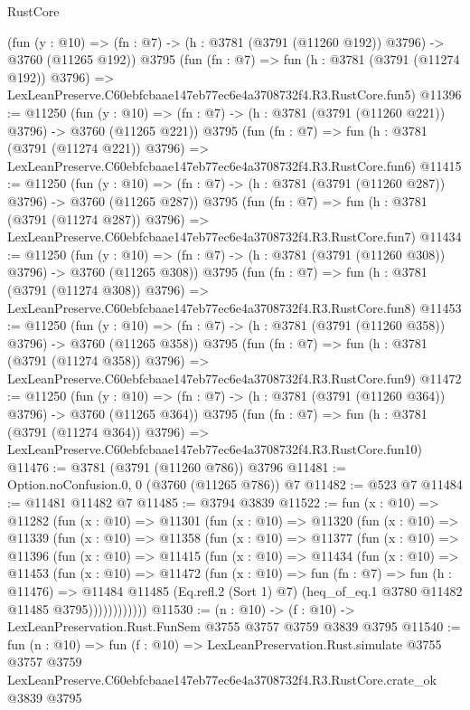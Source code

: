 \begin{lexlean}{RustCore}
\begin{coremodule}
    (fun (y : @10) => (fn : @7) -> (h : @3781 (@3791 (@11260 @192)) @3796) -> @3760 (@11265 @192))
    @3795
    (fun (fn : @7) =>
    fun (h : @3781 (@3791 (@11274 @192)) @3796) =>
    LexLeanPreserve.C60ebfcbaae147eb77ec6e4a3708732f4.R3.RustCore.fun5)
@11396 := @11250
    (fun (y : @10) => (fn : @7) -> (h : @3781 (@3791 (@11260 @221)) @3796) -> @3760 (@11265 @221))
    @3795
    (fun (fn : @7) =>
    fun (h : @3781 (@3791 (@11274 @221)) @3796) =>
    LexLeanPreserve.C60ebfcbaae147eb77ec6e4a3708732f4.R3.RustCore.fun6)
@11415 := @11250
    (fun (y : @10) => (fn : @7) -> (h : @3781 (@3791 (@11260 @287)) @3796) -> @3760 (@11265 @287))
    @3795
    (fun (fn : @7) =>
    fun (h : @3781 (@3791 (@11274 @287)) @3796) =>
    LexLeanPreserve.C60ebfcbaae147eb77ec6e4a3708732f4.R3.RustCore.fun7)
@11434 := @11250
    (fun (y : @10) => (fn : @7) -> (h : @3781 (@3791 (@11260 @308)) @3796) -> @3760 (@11265 @308))
    @3795
    (fun (fn : @7) =>
    fun (h : @3781 (@3791 (@11274 @308)) @3796) =>
    LexLeanPreserve.C60ebfcbaae147eb77ec6e4a3708732f4.R3.RustCore.fun8)
@11453 := @11250
    (fun (y : @10) => (fn : @7) -> (h : @3781 (@3791 (@11260 @358)) @3796) -> @3760 (@11265 @358))
    @3795
    (fun (fn : @7) =>
    fun (h : @3781 (@3791 (@11274 @358)) @3796) =>
    LexLeanPreserve.C60ebfcbaae147eb77ec6e4a3708732f4.R3.RustCore.fun9)
@11472 := @11250
    (fun (y : @10) => (fn : @7) -> (h : @3781 (@3791 (@11260 @364)) @3796) -> @3760 (@11265 @364))
    @3795
    (fun (fn : @7) =>
    fun (h : @3781 (@3791 (@11274 @364)) @3796) =>
    LexLeanPreserve.C60ebfcbaae147eb77ec6e4a3708732f4.R3.RustCore.fun10)
@11476 := @3781 (@3791 (@11260 @786)) @3796
@11481 := Option.noConfusion.{0, 0} (@3760 (@11265 @786)) @7
@11482 := @523 @7
@11484 := @11481 @11482 @7
@11485 := @3794 @3839
@11522 := fun (x : @10) =>
  @11282
    (fun (x : @10) =>
    @11301
      (fun (x : @10) =>
      @11320
        (fun (x : @10) =>
        @11339
          (fun (x : @10) =>
          @11358
            (fun (x : @10) =>
            @11377
              (fun (x : @10) =>
              @11396
                (fun (x : @10) =>
                @11415
                  (fun (x : @10) =>
                  @11434
                    (fun (x : @10) =>
                    @11453
                      (fun (x : @10) =>
                      @11472
                        (fun (x : @10) =>
                        fun (fn : @7) =>
                        fun (h : @11476) =>
                        @11484
                          @11485
                          (Eq.refl.{2} (Sort 1) @7)
                          (heq_of_eq.{1} @3780 @11482 @11485 @3795))))))))))))
@11530 := (n : @10) -> (f : @10) -> LexLeanPreservation.Rust.FunSem @3755 @3757 @3759 @3839 @3795
@11540 := fun (n : @10) =>
  fun (f : @10) =>
  LexLeanPreservation.Rust.simulate
    @3755
    @3757
    @3759
    LexLeanPreserve.C60ebfcbaae147eb77ec6e4a3708732f4.R3.RustCore.crate_ok
    @3839
    @3795
\end{coremodule}
\end{lexlean}
